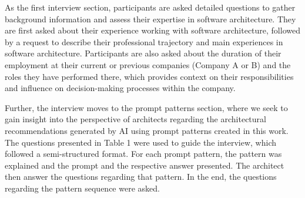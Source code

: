\documentclass[runningheads]{llncs}
\begin{document}
As the first interview section, participants are asked detailed questions to gather background information and assess their expertise in software architecture. They are first asked about their experience working with software architecture, followed by a request to describe their professional trajectory and main experiences in software architecture. Participants are also asked about the duration of their employment at their current or previous companies (Company A or B) and the roles they have performed there, which provides context on their responsibilities and influence on decision-making processes within the company.

Further, the interview moves to the prompt patterns section, where we seek to gain insight into the perspective of architects regarding the architectural recommendations generated by AI using prompt patterns created in this work. The questions presented in Table 1 were used to guide the interview, which followed a semi-structured format. For each prompt pattern, the pattern was explained and the prompt and the respective answer presented. The architect then answer the questions regarding that pattern. In the end, the questions regarding the pattern sequence were asked. 
\end{document}
